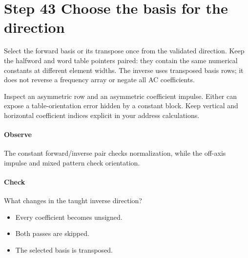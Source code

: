 \section{Step 43 Choose the basis for the direction}\label{h263-transform-s03}
Select the forward basis or its transpose once from the validated direction.
Keep the halfword and word table pointers paired: they contain the same numerical
constants at different element widths. The inverse uses transposed basis rows;
it does not reverse a frequency array or negate all AC coefficients.

Inspect an asymmetric row and an asymmetric coefficient impulse. Either can
expose a table-orientation error hidden by a constant block. Keep vertical and
horizontal coefficient indices explicit in your address calculations.

\paragraph{Observe} The constant forward/inverse pair checks normalization,
while the off-axis impulse and mixed pattern check orientation.
\paragraph{Check} What changes in the taught inverse direction?
\begin{itemize}
  \item[A.] Every coefficient becomes unsigned.
  \item[B.] Both passes are skipped.
  \item[C.] The selected basis is transposed.
\end{itemize}
